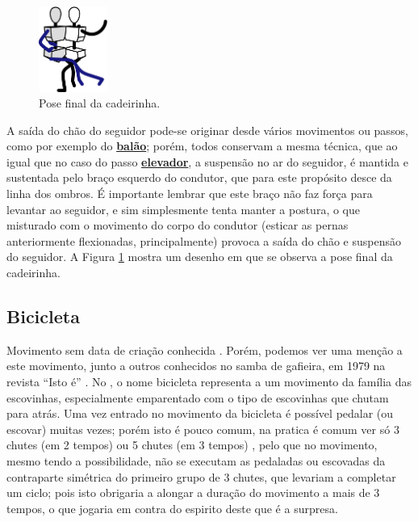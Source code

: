 \begin{figure}
  \vspace{-10pt}
  \centering
    \includegraphics[width=0.20\textwidth]{chapters/cap-historia-passos/cadeirinha.eps}
  \caption{Pose final da  cadeirinha.}
  \label{fig:cadeirinhastickman}
  \vspace{-10pt}
\end{figure}
A saída do chão do seguidor pode-se originar desde vários movimentos ou passos,
como por exemplo do  \hyperref[def:PassoBalao]{\textbf{balão}}; 
porém,
todos conservam a mesma técnica, que ao igual que  no caso do passo  \hyperref[def:PassoElevador]{\textbf{elevador}},
a suspensão no ar do seguidor, é mantida e sustentada pelo braço esquerdo do condutor,
que para este propósito  desce da linha dos ombros.
É importante lembrar que este braço não faz força para levantar ao seguidor, 
e sim simplesmente tenta manter a postura,
o que misturado com o movimento do corpo do condutor (esticar as pernas anteriormente flexionadas, principalmente)
provoca a saída do chão e suspensão do seguidor.
A Figura \ref{fig:cadeirinhastickman} mostra um desenho em que se observa a pose final da cadeirinha.


\subsection{Bicicleta}

Movimento sem data de criação conhecida \cite[pp. 143,144]{perna2002samba}.
Porém, podemos ver uma menção a este movimento, junto a outros conhecidos no samba de gafieira, 
em 1979 na revista ``Isto é'' \cite[pp. 89]{revista1979isto}.
No \AnoLivro, o nome bicicleta representa a um movimento da família das escovinhas,
especialmente emparentado com o tipo de escovinhas que chutam para atrás.
Uma vez entrado no movimento da bicicleta é possível pedalar (ou escovar) muitas vezes;
porém isto é pouco comum, na pratica é comum ver só 3 chutes (em 2 tempos) ou 5 chutes (em 3 tempos) ,
pelo que no movimento, mesmo tendo a possibilidade, 
não se executam as pedaladas ou escovadas da contraparte simétrica do primeiro grupo de 3 chutes,
que levariam a completar um ciclo;
pois isto obrigaria a alongar a duração do movimento a mais de 3 tempos,
o que jogaria em contra do espirito deste que é a surpresa.


